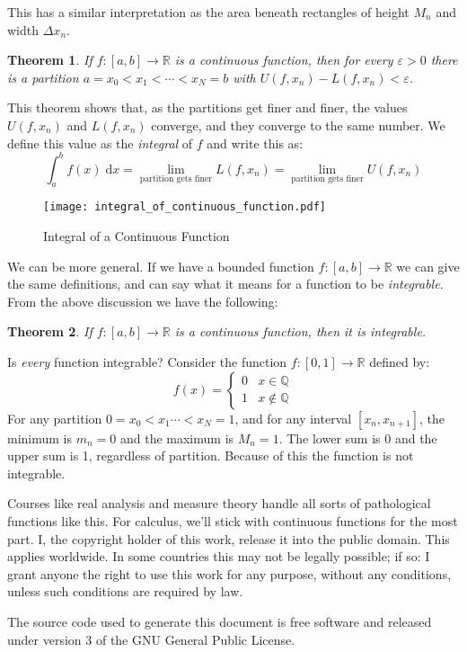 \documentclass{article}
\theoremstyle{plain}
\newtheorem{theorem}{Theorem}
\begin{document}
    This has a similar interpretation as the area beneath rectangles of height
    $M_{n}$ and width $\Delta{x}_{n}$.
    \begin{theorem}
        If $f:[a,b]\rightarrow\mathbb{R}$ is a continuous function, then for
        every $\varepsilon>0$ there is a partition
        $a=x_{0}<x_{1}<\cdots<x_{N}=b$ with
        $U(f,x_{n})-L(f,x_{n})<\varepsilon$.
    \end{theorem}
    This theorem shows that, as the partitions get finer and finer, the
    values $U(f,x_{n})$ and $L(f,x_{n})$ converge, and they converge to the
    same number. We define this value as the \textit{integral} of $f$ and write
    this as:
    \begin{equation}
        \int_{a}^{b}f(x)\;\textrm{d}x
            =\lim_{\textrm{partition gets finer}}L(f,x_{n})
            =\lim_{\textrm{partition gets finer}}U(f,x_{n})
    \end{equation}
    \begin{figure}
        \centering
        \texttt{[image: integral\_of\_continuous\_function.pdf]}
        \caption{Integral of a Continuous Function}
    \end{figure}
    We can be more general. If we have a bounded function
    $f:[a,b]\rightarrow\mathbb{R}$ we can give the same definitions, and can
    say what it means for a function to be \textit{integrable}. From the above
    discussion we have the following:
    \begin{theorem}
        If $f:[a,b]\rightarrow\mathbb{R}$ is a continuous function, then it is
        integrable.
    \end{theorem}
    Is \textit{every} function integrable? Consider the function
    $f:[0,1]\rightarrow\mathbb{R}$ defined by:
    \begin{equation}
        f(x)=
        \begin{cases}
            0&x\in\mathbb{Q}\\
            1&x\notin\mathbb{Q}
        \end{cases}
    \end{equation}
    For any partition $0=x_{0}<x_{1}\cdots<x_{N}=1$, and for any interval
    $[x_{n},x_{n+1}]$, the minimum is $m_{n}=0$ and the maximum is $M_{n}=1$.
    The lower sum is 0 and the upper sum is 1, regardless of partition. Because
    of this the function is not integrable.
    \par\hfill\par
    Courses like real analysis and measure theory handle all sorts of
    pathological functions like this. For calculus, we'll stick with continuous
    functions for the most part.
    \newpage
    I, the copyright holder of this work, release it into the public domain.
    This applies worldwide. In some countries this may not be legally possible;
    if so: I grant anyone the right to use this work for any purpose, without
    any conditions, unless such conditions are required by law.
    \par\hfill\par
    The source code used to generate this document is free software and released
    under version 3 of the GNU General Public License.
\end{document}
